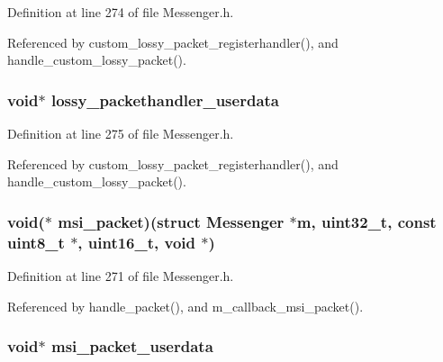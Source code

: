 Definition at line 274 of file Messenger.\+h.



Referenced by custom\+\_\+lossy\+\_\+packet\+\_\+registerhandler(), and handle\+\_\+custom\+\_\+lossy\+\_\+packet().

\hypertarget{struct_messenger_a2b87de1f33a502c6dd105cd69a905c35}{
\subsubsection[{lossy\+\_\+packethandler\+\_\+userdata}]{\setlength{\rightskip}{0pt plus 5cm}void$\ast$ lossy\+\_\+packethandler\+\_\+userdata}}\label{struct_messenger_a2b87de1f33a502c6dd105cd69a905c35}


Definition at line 275 of file Messenger.\+h.



Referenced by custom\+\_\+lossy\+\_\+packet\+\_\+registerhandler(), and handle\+\_\+custom\+\_\+lossy\+\_\+packet().

\hypertarget{struct_messenger_a94a1e6432d69be20e4da5e919f4c61e5}{
\subsubsection[{msi\+\_\+packet}]{\setlength{\rightskip}{0pt plus 5cm}void($\ast$ msi\+\_\+packet)(struct {\bf Messenger} $\ast${\bf m}, uint32\+\_\+t, const uint8\+\_\+t $\ast$, uint16\+\_\+t, void $\ast$)}}\label{struct_messenger_a94a1e6432d69be20e4da5e919f4c61e5}


Definition at line 271 of file Messenger.\+h.



Referenced by handle\+\_\+packet(), and m\+\_\+callback\+\_\+msi\+\_\+packet().

\hypertarget{struct_messenger_a1b0f16a3c32591e1bc33406459dfac29}{
\subsubsection[{msi\+\_\+packet\+\_\+userdata}]{\setlength{\rightskip}{0pt plus 5cm}void$\ast$ msi\+\_\+packet\+\_\+userdata}}\label{struct_messenger_a1b0f16a3c32591e1bc33406459dfac29}


